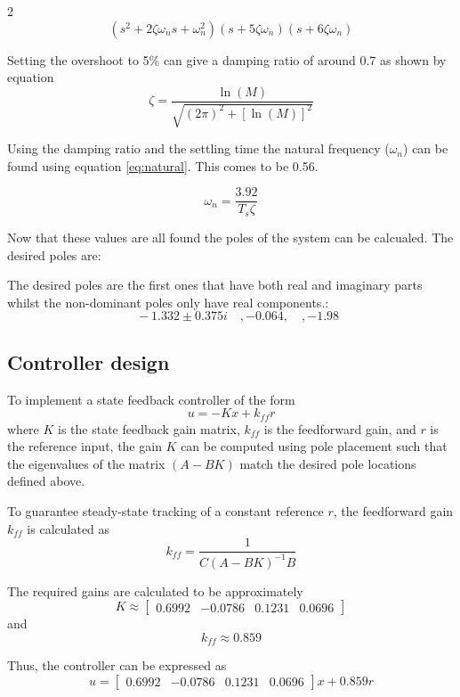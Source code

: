 \documentclass[12pt]{article}
\begin{document}
\begin{multicols}{2}
\begin{equation}
\left(s^2 + 2\zeta \omega_n s + \omega_n^2\right)\left(s + 5\zeta \omega_n\right)\left(s + 6\zeta \omega_n\right)
\label{eq:desired}
\end{equation}

Setting the overshoot to 5\% can give a damping ratio of around 0.7 as shown by equation \label{eq:damping}
\begin{equation}
\zeta = \frac{\ln(M)}{\sqrt{(2\pi)^2 + \left[\ln(M)\right]^2}}
\label{eq:damping}
\end{equation}

Using the damping ratio and the settling time the natural frequency ($\omega_n$) can be found using equation \ref{eq:natural}. This comes to be 0.56.

\begin{equation}
    \omega_n=\frac{3.92}{T_s \zeta}
    \label{eq:natural}
\end{equation}

Now that these values are all found the poles of the system can be calcualed. The desired poles are:

The desired poles are the first ones that have both real and imaginary parts whilst the non-dominant poles only have real components.:
\[
\quad -1.332 \pm 0.375i \quad , -0.064, \quad, -1.98
\]

\subsection{Controller design}
To implement a state feedback controller of the form
\[
u = -Kx + k_{ff} r
\]
where \(K\) is the state feedback gain matrix, \(k_{ff}\) is the feedforward gain, and \(r\) is the reference input, the gain \(K\) can be computed using pole placement such that the eigenvalues of the matrix \((A - BK)\) match the desired pole locations defined above.

To guarantee steady-state tracking of a constant reference \(r\), the feedforward gain \(k_{ff}\) is calculated as
\[
k_{ff} = \frac{1}{C (A - BK)^{-1} B}
\]

The required gains are calculated to be approximately
\[
K \approx \begin{bmatrix} 0.6992 & -0.0786& 0.1231 & 0.0696 \end{bmatrix}
\]
and
\[
k_{ff} \approx 0.859
\]

Thus, the controller can be expressed as
\[
u = \begin{bmatrix} 0.6992 & -0.0786& 0.1231 & 0.0696 \end{bmatrix} x + 0.859 r
\]



\end{multicols}
\end{document}
